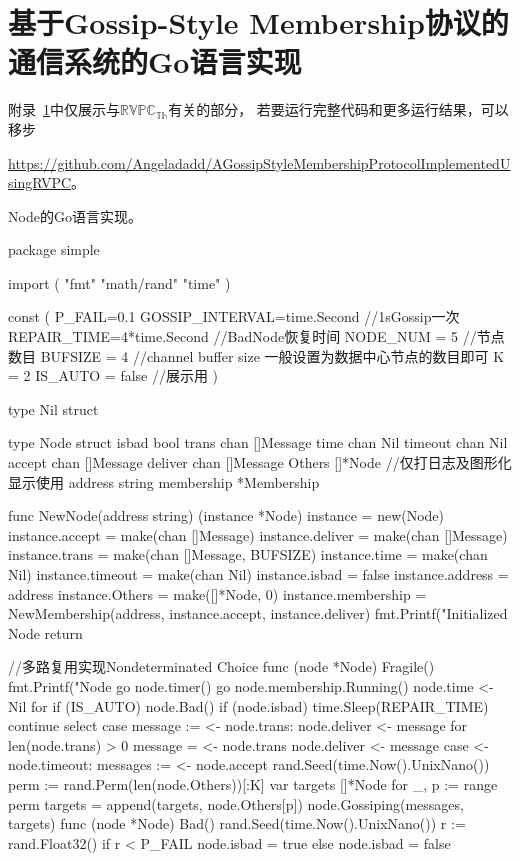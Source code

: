 \chapter{基于Gossip-Style Membership协议的通信系统的Go语言实现}\label{app:code}
附录~\ref{app:code}中仅展示与$\mathbb{RVPC}_{\mathbb{Th}}$有关的部分，
若要运行完整代码和更多运行结果，可以移步

\url{https://github.com/Angeladadd/AGossipStyleMembershipProtocolImplementedUsingRVPC}。

Node的Go语言实现。
\begin{codeblock}[language=GO]
	package simple

	import (
		"fmt"
		"math/rand"
		"time"
	)
	
	const (
		P_FAIL=0.1
		GOSSIP_INTERVAL=time.Second //1sGossip一次
		REPAIR_TIME=4*time.Second //BadNode恢复时间
		NODE_NUM = 5 //节点数目
		BUFSIZE = 4 //channel buffer size 一般设置为数据中心节点的数目即可
		K = 2
		IS_AUTO = false //展示用
	)
	
	type Nil struct {}
	
	type Node struct {
		isbad bool
		trans chan []Message
		time chan Nil
		timeout chan Nil
		accept chan []Message
		deliver chan []Message
		Others []*Node
		//仅打日志及图形化显示使用
		address string
		membership *Membership
	}
	
	func NewNode(address string) (instance *Node) {
		instance = new(Node)
		instance.accept = make(chan []Message)
		instance.deliver = make(chan []Message)
		instance.trans = make(chan []Message, BUFSIZE)
		instance.time = make(chan Nil)
		instance.timeout = make(chan Nil)
		instance.isbad = false
		instance.address = address
		instance.Others = make([]*Node, 0)
		instance.membership = NewMembership(address, instance.accept, instance.deliver)
		fmt.Printf("Initialized Node %
		return
	}
	
	//多路复用实现Nondeterminated Choice
	func (node *Node) Fragile() {
		fmt.Printf("Node %
		go node.timer()
		go node.membership.Running()
		node.time <- Nil{}
		for {
			if (IS_AUTO) {
				node.Bad()
			}
			if (node.isbad) {
				time.Sleep(REPAIR_TIME)
				continue
			}
			select {
			case message := <- node.trans:
				node.deliver <- message
				for len(node.trans) > 0 {
					message = <- node.trans
					node.deliver <- message
				}
			case <- node.timeout:
				messages := <- node.accept
				rand.Seed(time.Now().UnixNano())
				perm := rand.Perm(len(node.Others))[:K]
				var targets []*Node
				for _, p := range perm {
					targets = append(targets, node.Others[p])
				}
				node.Gossiping(messages, targets)
			}
		}
	}
	func (node *Node) Bad() {
		rand.Seed(time.Now().UnixNano())
			r := rand.Float32()
			if r < P_FAIL {
				node.isbad = true
			} else {
				node.isbad = false
			}
	}
	

\end{codeblock}
